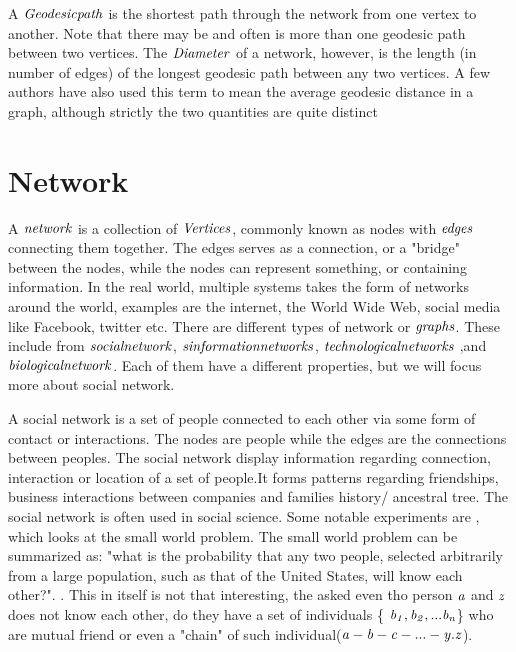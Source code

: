 A $\it{{Geodesic path}}$ is the shortest path through the network from one vertex to another. Note that there may be and often is more than one geodesic path between two vertices. The $\it{{Diameter}}$ of a network, however,  is the length (in number of edges) of the longest geodesic path between any two vertices. A few authors have also used this term to mean the average geodesic distance in a graph, although strictly the two quantities are quite distinct

\section{Network}
A $\it{network}$ is a collection of $\it{Vertices}$, commonly known as nodes with $\it{edges}$ connecting them together\cite{ComplexNetwork2003}. The edges serves as a connection, or a "bridge" between the nodes, while the nodes can represent something, or containing information. In the real world, multiple systems takes the form of networks around the world, examples are the internet, the World Wide Web, social media like Facebook, twitter etc.  There are different types of network or $\it{graphs}$. These include from $\it{social network}$, $\it {sinformation networks}$, $\it{technological networks}$ ,and $\it{biological network}$.  Each of them have a different properties, but we will focus more about social network.

A social network is a set of people connected to each other via some form of contact or interactions\cite{ComplexNetwork2003}. The nodes are people while the edges are the connections between peoples. The social network display information regarding connection, interaction or location of a set of people.It forms patterns regarding friendships, business interactions between companies and families history/ ancestral tree. The social network is often used in social science\cite{ComplexNetwork2003}. Some notable experiments are \cite{smallWorldExperiment}, which looks at the small world problem. The small world problem can be summarized as: "what is the probability that any two people, selected arbitrarily from a large population, such as that of the United States, will know each other?". \cite{smallworldExperiment1969}. This in itself is not that interesting, the \cite{SmallworldExperiment1969} asked even tho  person $\it{a}$ and $\it{z}$ does not know each other, do they have a set of individuals \{ $\it {b_1, b_2, ... b_n} $\} who are mutual friend or even a "chain" of such individual($\it {a-b-c-...-y.z}$).

